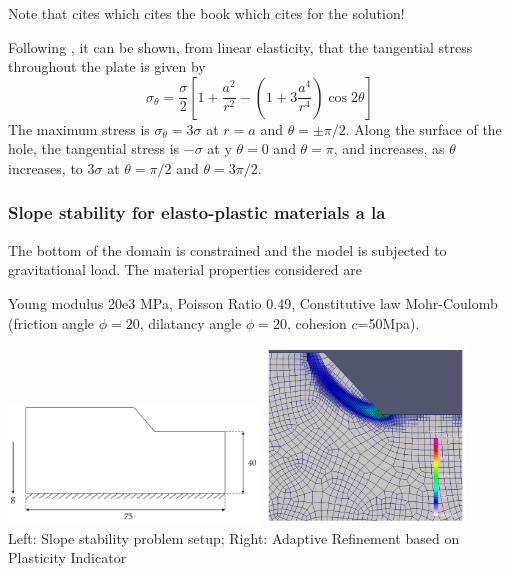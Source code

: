 Note that \cite{rama16} cites \cite{chnn10} which cites the book \cite[p772]{yobu02} 
which cites \cite{budynas} for the solution!

Following \cite{yobu02}, it can be shown, from linear elasticity, that the tangential
stress throughout the plate is given by
\[
\sigma_\theta = \frac{\sigma}{2} \left[ 1+\frac{a^2}{r^2} - \left( 1+3\frac{a^4}{r^4}  \right) \cos 2\theta   \right]
\]
The maximum stress is $\sigma_\theta=3\sigma$ at $r=a$ and $\theta=\pm \pi/2$. Along the surface of the hole, 
the tangential stress is $-\sigma$ at y $\theta=0$  and $\theta=\pi$, 
and increases, as $\theta$ increases, to $3\sigma$ at $\theta=\pi/2$ and $\theta=3\pi/2$.
 

\subsubsection{Slope stability for elasto-plastic materials a la \cite{rama16}}
\mscthesis {}

The bottom of the domain is constrained and the model is 
subjected to gravitational load. The material properties considered are

Young modulus 20e3 MPa, Poisson Ratio 0.49, Constitutive law Mohr-Coulomb 
(friction angle $\phi=20$\degree, 
dilatancy angle $\phi=20$\degree, cohesion $c$=50Mpa).

\begin{center}
\includegraphics[width=0.5\textwidth]{images/benchmark_slope/rama16c}
\includegraphics[width=0.4\textwidth]{images/benchmark_slope/rama16b}\\
{\captionfont Left: Slope stability problem setup; Right: Adaptive Refinement based 
on Plasticity Indicator}
\end{center}


